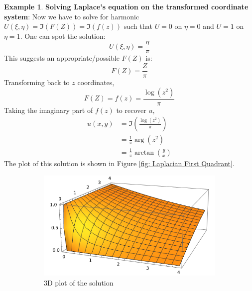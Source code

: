 \documentclass[a4paper, 12pt]{article}
\theoremstyle{definition}
\newtheorem{example}{Example}
\numberwithin{theorem}{section}
\numberwithin{definition}{section}
\numberwithin{exercise}{section}
\numberwithin{remark}{section}
\numberwithin{figure}{section}
\numberwithin{example}{section}
\begin{document}
\begin{example}
    \textbf{Solving Laplace's equation on the transformed coordinate system}:
    Now we have to solve for harmonic $U\left( \xi, \eta \right) = \Im \left( F(Z) \right) = \Im \left( f(z) \right)$ such that $U=0$ on $\eta = 0$ and $U = 1$ on $\eta = 1$.
    One can spot the solution:
    \begin{equation*}
        U\left( \xi, \eta \right) = \frac{\eta}{\pi}
    \end{equation*}
    This suggests an appropriate/possible $F(Z)$ is:
    \begin{equation*}
        F(Z) = \frac{Z}{\pi}
    \end{equation*}
    Transforming back to $z$ coordinates,
    \begin{equation*}
        F(Z) = f(z) = \frac{\log \left( z^2 \right)}{\pi} 
    \end{equation*}
    Taking the imaginary part of $f(z)$ to recover $u$,
    \begin{align*}
    u(x,y) &= \Im \left( \frac{\log \left( z^2 \right)}{\pi} \right) \\
    &= \frac{1}{\pi} \arg \left( z^2 \right) \\
    &= \frac{1}{\pi} \arctan \left( \frac{y}{x} \right)
    \end{align*}
    The plot of this solution is shown in Figure \ref{fig: Laplacian First Quadrant}.
    \begin{figure}[tbp]
        \centering
        \begin{subfigure}[b]{0.5\textwidth}
            \centering
            \includegraphics[width=\textwidth]{FanLaplacian1}
            \caption{3D plot of the solution}
        \end{subfigure}
        \hfill
        \begin{subfigure}[b]{0.5\textwidth}

\end{subfigure}
\end{figure}
\end{example}
\end{document}
